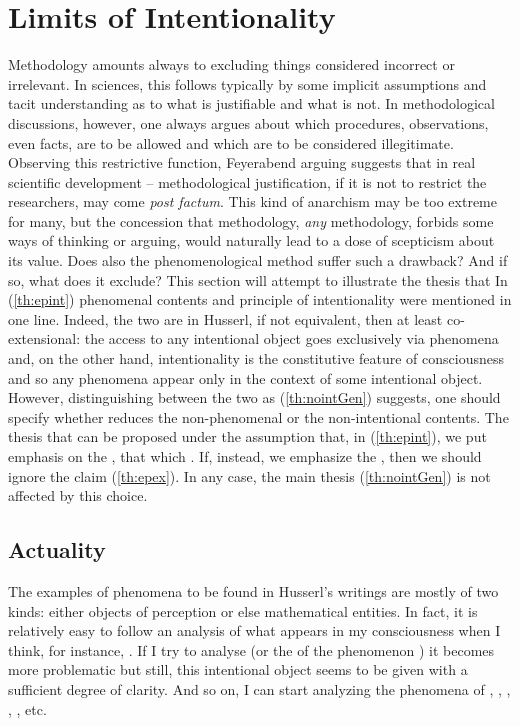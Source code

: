 \section{Limits of Intentionality}\label{sec:limits}
Methodology amounts always to excluding things considered incorrect 
or 
irrelevant. In sciences, this follows typically by some implicit 
assumptions and tacit understanding as to what is justifiable and what is not. 
In methodological discussions, 
however, one always argues about which procedures, observations, even 
facts, are to be allowed and which are to be considered illegitimate. 
Observing this restrictive function, Feyerabend arguing  suggests that in real scientific development 
 -- methodological justification, if it is not to restrict 
the researchers, may come {\em post factum}. This 
kind 
of anarchism may be too extreme for many, but the concession that 
methodology, {\em any} methodology, forbids some ways of thinking or 
arguing, would naturally lead to a dose of scepticism about its value. Does also
the phenomenological method suffer such a drawback? And if 
so, what does it exclude?
This section will attempt to illustrate the thesis that 
In (\ref{th:epint}) phenomenal contents and principle of intentionality were 
mentioned in one line. Indeed, the two are in Husserl, if not equivalent, then 
at least co-extensional: the access to 
any intentional object goes exclusively via phenomena and, on the other hand, 
intentionality is the constitutive feature of consciousness and so any phenomena 
appear only in the context of some intentional object.
However, distinguishing between the two as (\ref{th:nointGen}) suggests, one should 
specify whether  reduces the non-phenomenal or the non-intentional 
contents. 
The thesis that
can be proposed under the assumption that, in (\ref{th:epint}), we put 
emphasis on the , 
that which . If, instead, we 
emphasize the , then we should ignore the claim (\ref{th:epex}). 
In any case, the main thesis (\ref{th:nointGen}) is not affected by this choice.
%
\subsection{Actuality}
The examples of phenomena to be found in Husserl's writings are mostly 
of two kinds: either objects of perception or else mathematical 
entities. In fact, it is relatively easy to follow an analysis of 
what appears in my consciousness when I think, for 
instance, . If I try to analyse 
 (or the  of the phenomenon ) 
it becomes more problematic but still, this intentional object seems 
to be given with a sufficient degree of clarity. 
And so on, I can start analyzing the phenomena of , , , 
, , etc.

